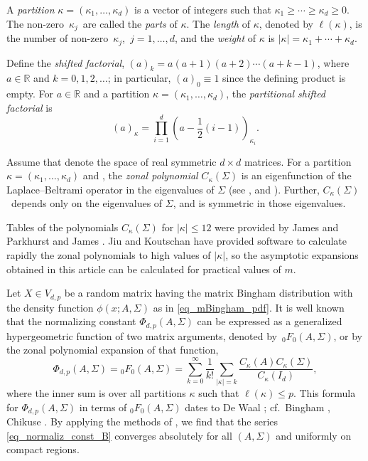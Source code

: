 \documentclass[pdftex]{sigma}
\numberwithin{equation}{section}
\def\R {\mathbb{R}}
\newcommand{\sym}{{{\hskip-1pt}\mathop{\mathrm{sym}}}}
\begin{document}
A \textit{partition} $\kappa = (\kappa_1,\ldots,\kappa_d)$ is a vector of integers such that $\kappa_1 \ge \cdots \ge \kappa_d \ge 0$. The non-zero~$\kappa_j$~are called the \textit{parts} of $\kappa$. The \textit{length} of $\kappa$, denoted by $\ell(\kappa)$, is the number of non-zero~$\kappa_j$,~$j=1,\ldots,d$, and the \textit{weight} of $\kappa$ is $|\kappa| = \kappa_1+\cdots+\kappa_d$.

Define the \textit{shifted factorial}, $(a)_k = a(a+1)(a+2) \cdots (a+k-1)$, where $a \in \mathbb{R}$ and ${k=0,1,2,\ldots}$; in particular, $(a)_0 \equiv 1$ since the defining product is empty. For $a \in \mathbb{R}$ and a partition ${\kappa = (\kappa_1,\ldots,\kappa_d)}$, the {\it partitional shifted factorial} is %
\begin{equation}
\label{eq_partit_fact}
(a)_\kappa = \prod_{i=1}^d \left(a-\frac{1}{2}(i-1)\right)_{\kappa_i}.
\end{equation}

Assume that \smash{$\R^{d \times d}_\sym$} denote the space of real symmetric $d \times d$ matrices. For a partition $\kappa = (\kappa_1,\ldots,\kappa_d)$ and \smash{$\Sigma \in \R^{d \times d}_\sym$}, the \textit{zonal polynomial} $C_\kappa(\Sigma)$ is an eigenfunction of the Laplace--Beltrami operator in the eigenvalues of $\Sigma$ (see \cite{James68}, \cite[Chapter 7]{Muirhead} and \cite{Richards10}). Further, $C_\kappa(\Sigma)$~depends only on the eigenvalues of $\Sigma$, and is symmetric in those eigenvalues.

Tables of the polynomials $C_\kappa(\Sigma)$ for $|\kappa| \le 12$ were provided by James \cite[pp.~498--499]{James64} and Parkhurst and James \cite{ParkhurstJames}. Jiu and Koutschan \cite{JiuKoutschan} have provided software to calculate rapidly the zonal polynomials to high values of $|\kappa|$, so the asymptotic expansions obtained in this article can be calculated for practical values of $m$.

Let $X \in V_{d,p}$ be a random matrix having the matrix Bingham distribution with the density function $\phi(x;A,\Sigma)$ as in \eqref{eq_mBingham_pdf}. It is well known that the normalizing constant $\Phi_{d,p}(A,\Sigma)$ can be expressed as a generalized hypergeometric function of two matrix arguments, denoted by~${}_0F_0(A,\Sigma)$, or by the zonal polynomial expansion of that function,
\begin{equation}
\label{eq_normaliz_const_B}
\Phi_{d,p}(A,\Sigma) = {}_0F_0(A,\Sigma) = \sum_{k=0}^\infty \frac{1}{k!} \sum_{|\kappa|=k} \frac{C_\kappa(A) C_\kappa(\Sigma)}{C_\kappa(I_d)},
\end{equation}
where the inner sum is over all partitions $\kappa$ such that $\ell(\kappa) \le p$. This formula for $\Phi_{d,p}(A,\Sigma)$ in terms of ${}_0F_0(A,\Sigma)$ dates to De Waal \cite{DeWaal}; cf.\ Bingham \cite{Bingham}, Chikuse \cite[p.~108]{Chikuse}. By applying the methods of \cite[Theorem~6.3]{GrossRichards}, we find that the series \eqref{eq_normaliz_const_B} converges absolutely for all $(A,\Sigma)$ and uniformly on compact regions.
\end{document}

